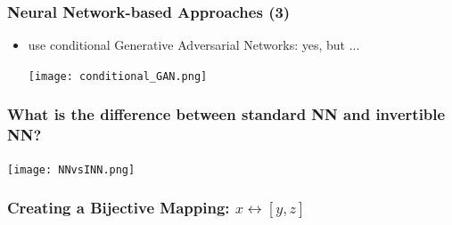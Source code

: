 \documentclass[aspectratio=43]{beamer}
\begin{document}
\begin{frame}
	\frametitle{Neural Network-based Approaches (3)}
	\begin{itemize}
		\item use conditional Generative Adversarial Networks: \alert{yes, but ...}
		\begin{center}
			\texttt{[image: conditional\_GAN.png]}\cite{Mirza2014}
		\end{center}
	\end{itemize}
\end{frame}


\begin{frame}
    \frametitle{What is the difference between standard NN and invertible NN?}
    \begin{center}
        \texttt{[image: NNvsINN.png]}\cite{Ardizzone1_2019}
    \end{center}
\end{frame}
        








\begin{frame}
	\frametitle{Creating a Bijective Mapping: $x \leftrightarrow [y, z]$}
	\begin{center}
		\cite{Ardizzone2_2019}
	\end{center}
\end{frame}


\end{document}
